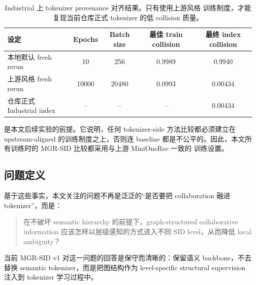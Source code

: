 \begin{table}[t]
  \centering
  \caption{Industrial 上 tokenizer provenance 对齐结果。只有使用上游风格 \rqvae{} 训练制度，才能复现当前仓库正式 tokenizer 的低 collision 质量。}
  \label{tab:provenance}
  \begin{tabular}{lcccc}
    \toprule
    设定 & Epochs & Batch size & 最佳 train collision & 最终 index collision \\
    \midrule
    本地默认 fresh rerun & 10 & 256 & 0.9989 & 0.9940 \\
    上游风格 fresh rerun & 10000 & 20480 & 0.0993 & 0.00434 \\
    仓库正式 Industrial index & -- & -- & -- & 0.00434 \\
    \bottomrule
  \end{tabular}
\end{table}

 是本文后续实验的前提。它说明，任何 tokenizer-side 方法比较都必须建立在 upstream-aligned 的训练制度之上，否则连 baseline 都是不公平的。因此，本文所有训练时的 MGR-SID 比较都采用与上游 MiniOneRec 一致的 \rqvae{} 训练设置。

\subsection{问题定义}

基于这些事实，本文关注的问题不再是泛泛的“是否要把 collaboration 融进 tokenizer”，而是：
\begin{quote}
在不破坏 semantic hierarchy 的前提下，graph-structured collaborative information 应该怎样以层级感知的方式进入不同 SID level，从而降低 local ambiguity？
\end{quote}

当前 MGR-SID v1 对这一问题的回答是保守而清晰的：保留语义 \rqvae{} backbone，不去替换 semantic tokenizer，而是把图结构作为 level-specific structural supervision 注入到 tokenizer 学习过程中。
